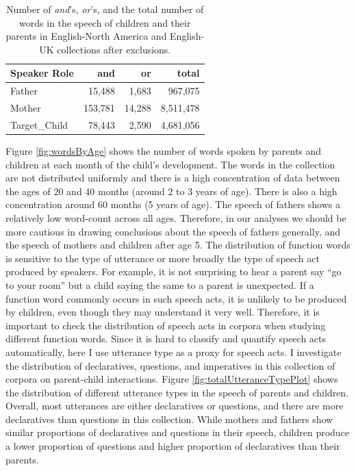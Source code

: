 \documentclass[,man,floatsintext]{apa6}
\begin{document}
\begin{table}[t]

\caption{\label{tab:countTable}Number of \textit{and}'s, \textit{or}'s, and the total number of words in the speech of children and their parents in English-North America and English-UK collections after exclusions.}
\centering
\begin{tabular}{l|r|r|r}
\hline
Speaker Role & and & or & total\\
\hline
Father & 15,488 & 1,683 & 967,075\\
\hline
Mother & 153,781 & 14,288 & 8,511,478\\
\hline
Target\_Child & 78,443 & 2,590 & 4,681,056\\
\hline
\end{tabular}
\end{table}

Figure \ref{fig:wordsByAge} shows the number of words spoken by parents and children at each month of the child's development. The words in the collection are not distributed uniformly and there is a high concentration of data between the ages of 20 and 40 months (around 2 to 3 years of age). There is also a high concentration around 60 months (5 years of age). The speech of fathers shows a relatively low word-count across all ages. Therefore, in our analyses we should be more cautious in drawing conclusions about the speech of fathers generally, and the speech of mothers and children after age 5.
The distribution of function words is sensitive to the type of utterance or more broadly the type of speech act produced by speakers. For example, it is not surprising to hear a parent say \enquote{go to your room} but a child saying the same to a parent is unexpected. If a function word commonly occurs in such speech acts, it is unlikely to be produced by children, even though they may understand it very well. Therefore, it is important to check the distribution of speech acts in corpora when studying different function words. Since it is hard to classify and quantify speech acts automatically, here I use utterance type as a proxy for speech acts. I investigate the distribution of declaratives, questions, and imperatives in this collection of corpora on parent-child interactions. Figure \ref{fig:totalUtteranceTypePlot} shows the distribution of different utterance types in the speech of parents and children. Overall, most utterances are either declaratives or questions, and there are more declaratives than questions in this collection. While mothers and fathers show similar proportions of declaratives and questions in their speech, children produce a lower proportion of questions and higher proportion of declaratives than their parents.
\end{document}
